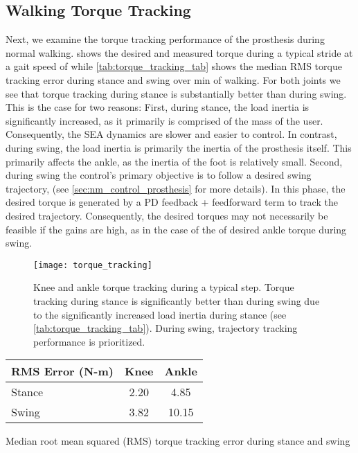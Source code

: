 \subsection{Walking Torque Tracking}
Next, we examine the torque tracking performance of the prosthesis during normal
walking.  shows the desired and measured torque
during a typical stride at a gait speed of  while
\cref{tab:torque_tracking_tab} shows the median RMS torque tracking error during
stance and swing over \unit[1]{min} of walking. For both joints we see that
torque tracking during stance is substantially better than during swing.  This
is the case for two reasons: First, during stance, the load inertia is
significantly increased, as it primarily is comprised of the mass of the user.
Consequently, the SEA dynamics are slower and easier to control. In contrast,
during swing, the load inertia is primarily the inertia of the prosthesis
itself. This primarily affects the ankle, as the inertia of the foot is
relatively small. Second, during swing the control's primary objective is to
follow a desired swing trajectory, (see \cref{sec:nm_control_prosthesis} for
more details). In this phase, the desired torque is generated by a PD feedback +
feedforward term to track the desired trajectory. Consequently, the desired
torques may not necessarily be feasible if the gains are high, as in the case of
the of desired ankle torque during swing.
\begin{figure}[t]
    \centering 
    \texttt{[image: torque\_tracking]}
    \caption[Knee and ankle torque tracking during a typical step]{Knee and
    ankle torque tracking during a typical step. Torque tracking during stance
    is significantly better than during swing due to the significantly increased
    load inertia during stance (see \cref{tab:torque_tracking_tab}). During
    swing, trajectory tracking performance is
    prioritized.}\label{fig:torque_tracking_plot}
\end{figure}
\begin{margintable}[-1in]
    \centering
    \small
    \begin{tabular}{lcc}
        RMS Error (N-m) & Knee & Ankle \\
        \midrule
        Stance & 2.20 & 4.85  \\
        Swing  & 3.82 & 10.15 \\
    \end{tabular}
    \caption{Median root mean squared (RMS) torque tracking error during stance
    and swing}\label{tab:torque_tracking_tab}
\end{margintable}

